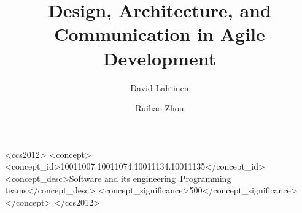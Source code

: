 \documentclass[sigplan,screen]{acmart}
\begin{document}
%
\title{Design, Architecture, and Communication in Agile Development}

%
\author{David Lahtinen}
\author{Ruihao Zhou}
\authornotemark[1]

%
\renewcommand{\shortauthors}{Trovato and Tobin, et al.}

%
\begin{abstract}

\end{abstract}

%
%
\begin{CCSXML}
<ccs2012>
  <concept>
    <concept_id>10011007.10011074.10011134.10011135</concept_id>
    <concept_desc>Software and its engineering~Programming teams</concept_desc>
    <concept_significance>500</concept_significance>
  </concept>
</ccs2012>
\end{CCSXML}


%

%
\maketitle
\end{document}
